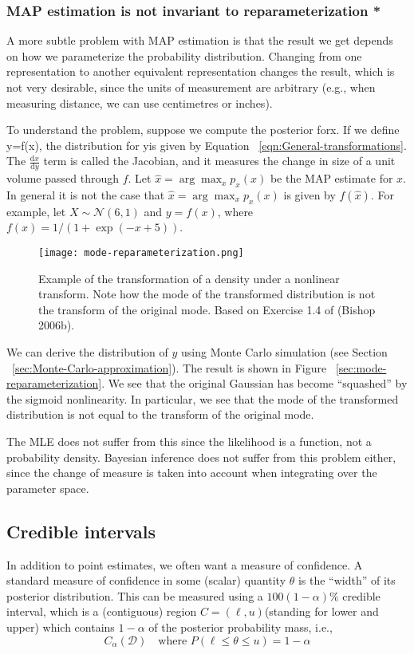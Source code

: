 \subsubsection{MAP estimation is not invariant to reparameterization *}
A more subtle problem with MAP estimation is that the result we get depends on how we parameterize the probability distribution. Changing from one representation to another equivalent representation changes the result, which is not very desirable, since the units of measurement are arbitrary (e.g., when measuring distance, we can use centimetres or inches).

To understand the problem, suppose we compute the posterior forx. If we define y=f(x), the distribution for yis given by Equation ~\eqref{eqn:General-transformations}. The $\frac{\mathrm{d}x}{\mathrm{d}y}$ term is called the Jacobian, and it measures the change in size of a unit volume passed
through $f$. Let $\hat{x}=\arg\max_x p_x(x)$ be the MAP estimate for $x$. In general it is not the case that $\hat{x}=\arg\max_x p_x(x)$ is given by $f(\hat{x})$. For example, let $X \sim \mathcal{N}(6,1)$ and $y=f(x)$, where $f(x)=1/(1+\exp(-x+5))$. 

\begin{figure}[hbtp]
\centering
    \texttt{[image: mode-reparameterization.png]}
\caption{Example of the transformation of a density under a nonlinear transform. Note how the mode of the transformed distribution is not the transform of the original mode. Based on Exercise 1.4 of (Bishop 2006b).}
\label{fig:mode-reparameterization} 
\end{figure}

We can derive the distribution of $y$ using Monte Carlo simulation (see Section ~\ref{sec:Monte-Carlo-approximation}). The result is shown in Figure ~\ref{sec:mode-reparameterization}. We see that the original Gaussian has become “squashed” by the sigmoid nonlinearity. In particular, we see that the mode of the transformed distribution is not equal to the transform of the original mode.

The MLE does not suffer from this since the likelihood is a function, not a probability density. Bayesian inference does not suffer from this problem either, since the change of measure is taken into account when integrating over the parameter space.


\subsection{Credible intervals}
\label{sec:Credible-intervals}
In addition to point estimates, we often want a measure of confidence. A standard measure of confidence in some (scalar) quantity $\theta$ is the “width” of its posterior distribution. This can be measured using a $100(1−\alpha)\%$ credible interval, which is a (contiguous) region $C=(\ell,u)$(standing for lower and upper) which contains $1−\alpha$ of the posterior probability mass, i.e.,
\begin{equation}
C_{\alpha}(\mathcal{D}) \quad \text{where } P(\ell \leq \theta \leq u)=1-\alpha
\end{equation}

